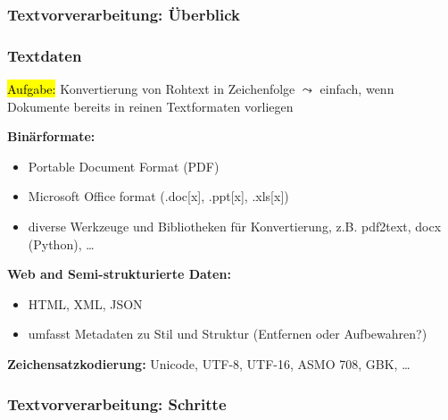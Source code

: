 
\begin{frame}
    \frametitle{Textvorverarbeitung: Überblick}

\end{frame}


\begin{frame}[shrink=10]
    \frametitle{Textdaten}

    \hl{Aufgabe:} Konvertierung von Rohtext in Zeichenfolge
    $\leadsto$ einfach, wenn Dokumente bereits in reinen Textformaten vorliegen

    \textbf{Binärformate:}
    \begin{itemize}
    \item Portable Document Format (PDF)
    \item Microsoft Office format (.doc[x], .ppt[x], .xls[x])
    \item diverse Werkzeuge und Bibliotheken für Konvertierung, z.B. pdf2text, docx (Python), \dots 
    \end{itemize}
    \textbf{Web and Semi-strukturierte Daten:}
    \begin{itemize}
    \item HTML, XML, JSON
    \item umfasst Metadaten zu Stil und Struktur (Entfernen oder Aufbewahren?)
     \end{itemize}
    \textbf{Zeichensatzkodierung:} Unicode, UTF-8, UTF-16, ASMO 708, GBK, \dots
    
\end{frame}



\begin{frame}
    \frametitle{Textvorverarbeitung: Schritte}

\end{frame}


